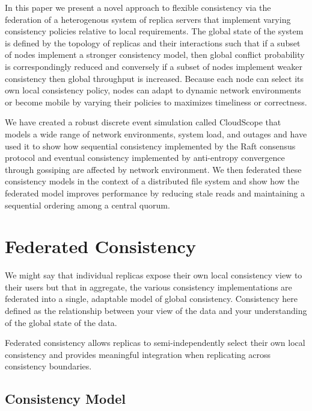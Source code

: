 \documentclass[letterpaper,twocolumn,10pt]{article}
\begin{document}
In this paper we present a novel approach to flexible consistency via the federation of a heterogenous system of replica servers that implement varying consistency policies relative to local requirements. The global state of the system is defined by the topology of replicas and their interactions such that if a subset of nodes implement a stronger consistency model, then global conflict probability is correspondingly reduced and conversely if a subset of nodes implement weaker consistency then global throughput is increased. Because each node can select its own local consistency policy, nodes can adapt to dynamic network environments or become mobile by varying their policies to maximizes timeliness or correctness.

We have created a robust discrete event simulation called CloudScope that models a wide range of network environments, system load, and outages and have used it to show how sequential consistency implemented by the Raft consensus protocol \cite{ongaro_search_2014} and eventual consistency implemented by anti-entropy convergence through gossiping \cite{demers_epidemic_1987} are affected by network environment. We then federated these consistency models in the context of a distributed file system and show how the federated model improves performance by reducing stale reads and maintaining a sequential ordering among a central quorum.


\section{Federated Consistency}\label{sec:federated_consistency}

We might say that individual replicas expose their own local consistency view to their users but that in aggregate, the various consistency implementations are federated into a single, adaptable model of global consistency. Consistency here defined as the relationship between your view of the data and your understanding of the global state of the data.

Federated consistency allows replicas to semi-independently select their own local consistency and provides meaningful integration when replicating across consistency boundaries.

\subsection{Consistency Model}\label{sec:consistency_model}
\end{document}
